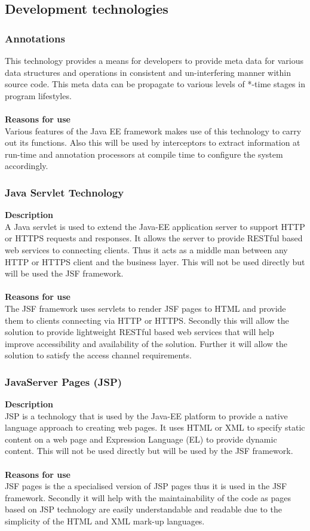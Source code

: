 \documentclass[12pt]{article}
\begin{document}
\subsection{Development technologies}
\subsubsection{Annotations}
This technology provides a means for developers to provide meta data for various data structures and operations in consistent and un-interfering manner within source code. This meta data can be propagate to various levels of *-time stages in program lifestyles.\\\\
\textbf{Reasons for use}\\
Various features of the Java EE framework makes use of this technology to carry out its functions. Also this will be used by interceptors to extract information at run-time and annotation processors at compile time to configure the system accordingly.  

\subsubsection{Java Servlet Technology}
\textbf{Description}\\
A Java servlet is used to extend the Java-EE application server to support HTTP or HTTPS requests and responses. It allows the server to provide RESTful based web services to connecting clients. Thus it acts as a middle man between any HTTP or HTTPS client and the business layer. This will not be used directly but will be used the JSF framework.\\\\
\textbf{Reasons for use}\\
The JSF framework uses servlets to render JSF pages to HTML and provide them to clients connecting via HTTP or HTTPS. Secondly this will allow the solution to provide lightweight RESTful based web services that will help improve accessibility and availability of the solution. Further it will allow the solution to satisfy the access channel requirements.

\subsubsection{JavaServer Pages (JSP)}
\textbf{Description}\\
JSP is a technology that is used by the Java-EE platform to provide a native language approach to creating web pages. It uses HTML or XML to specify static content on a web page and Expression Language (EL) to provide dynamic content. This will not be used directly but will be used by the JSF framework.\\\\
\textbf{Reasons for use}\\
JSF pages is the a specialised version of JSP pages thus it is used in the JSF framework. Secondly it will help with the maintainability of the code as pages based on JSP technology are easily understandable and readable due to the simplicity of the HTML and XML mark-up languages.    
 
\end{document}
